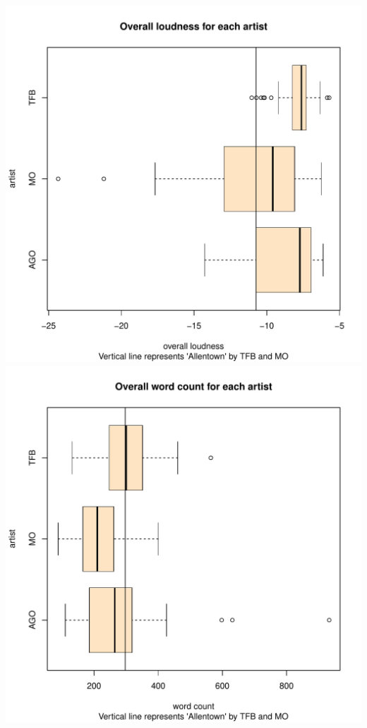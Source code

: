 \documentclass{article}\usepackage[]{graphicx}\usepackage[]{xcolor}
\makeatletter
\def\maxwidth{ %
  \ifdim\Gin@nat@width>\linewidth
    \linewidth
  \else
    \Gin@nat@width
  \fi
}
\newenvironment{knitrout}{}{} %
\makeatother
\begin{document}
\begin{multicols}{2}










\begin{knitrout}\scriptsize
{}\color{fgcolor}
\includegraphics[width=\maxwidth]{figure/unnamed-chunk-3-1} 
\end{knitrout}
\begin{knitrout}\scriptsize
{}\color{fgcolor}
\includegraphics[width=\maxwidth]{figure/unnamed-chunk-4-1} 

\end{knitrout}
\end{multicols}
\end{document}
